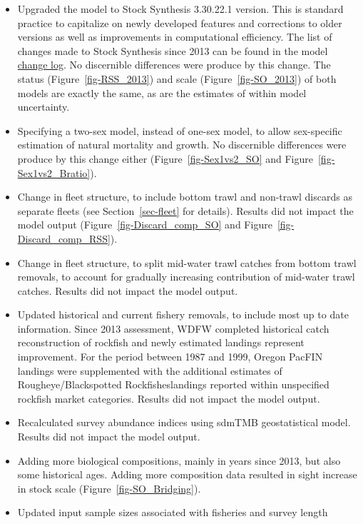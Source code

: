 \documentclass[
]{scrartcl}
\providecommand{\tightlist}{%
  \setlength{\itemsep}{0pt}\setlength{\parskip}{0pt}}\usepackage{longtable,booktabs,array}
\begin{document}
\begin{itemize}
\tightlist
\item
  Upgraded the model to Stock Synthesis 3.30.22.1 version. This is
  standard practice to capitalize on newly developed features and
  corrections to older versions as well as improvements in computational
  efficiency. The list of changes made to Stock Synthesis since 2013 can
  be found in the model
  \href{https://github.com/orgs/nmfs-ost/projects/11}{change log}. No
  discernible differences were produce by this change. The status
  (Figure~\ref{fig-RSS_2013}) and scale (Figure~\ref{fig-SO_2013}) of
  both models are exactly the same, as are the estimates of within model
  uncertainty.
\item
  Specifying a two-sex model, instead of one-sex model, to allow
  sex-specific estimation of natural mortality and growth. No
  discernible differences were produce by this change either
  (Figure~\ref{fig-Sex1vs2_SO} and Figure~\ref{fig-Sex1vs2_Bratio}).
\item
  Change in fleet structure, to include bottom trawl and non-trawl
  discards as separate fleets (see Section~\ref{sec-fleet} for details).
  Results did not impact the model output
  (Figure~\ref{fig-Discard_comp_SO} and
  Figure~\ref{fig-Discard_comp_RSS}).
\item
  Change in fleet structure, to split mid-water trawl catches from
  bottom trawl removals, to account for gradually increasing
  contribution of mid-water trawl catches. Results did not impact the
  model output.
\item
  Updated historical and current fishery removals, to include most up to
  date information. Since 2013 assessment, WDFW completed historical
  catch reconstruction of rockfish and newly estimated landings
  represent improvement. For the period between 1987 and 1999, Oregon
  PacFIN landings were supplemented with the additional estimates of
  Rougheye/Blackspotted Rockfisheslandings reported within unspecified
  rockfish market categories. Results did not impact the model output.
\item
  Recalculated survey abundance indices using sdmTMB geostatistical
  model. Results did not impact the model output.
\item
  Adding more biological compositions, mainly in years since 2013, but
  also some historical ages. Adding more composition data resulted in
  sight increase in stock scale (Figure~\ref{fig-SO_Bridging}).
\item
  Updated input sample sizes associated with fisheries and survey length

\end{itemize}
\end{document}

